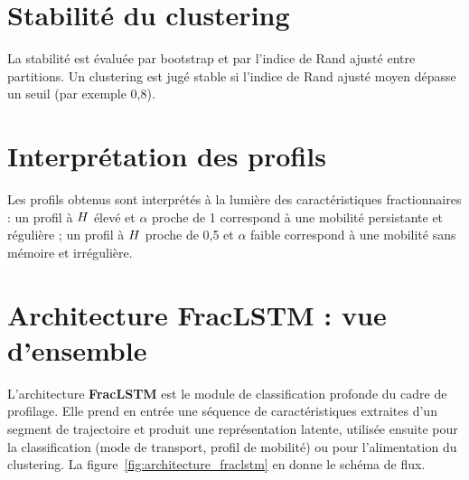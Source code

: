 \section{Stabilité du clustering}
La stabilité est évaluée par bootstrap et par l'indice de Rand ajusté entre partitions. Un clustering est jugé stable si l'indice de Rand ajusté moyen dépasse un seuil (par exemple 0,8).

\section{Interprétation des profils}
Les profils obtenus sont interprétés à la lumière des caractéristiques fractionnaires : un profil à $H$ élevé et $\alpha$ proche de 1 correspond à une mobilité persistante et régulière ; un profil à $H$ proche de 0,5 et $\alpha$ faible correspond à une mobilité sans mémoire et irrégulière.

\section{Architecture FracLSTM : vue d'ensemble}
\label{sec:architecture_fraclstm}

L'architecture \textbf{FracLSTM} est le module de classification profonde du cadre de profilage. Elle prend en entrée une séquence de caractéristiques extraites d'un segment de trajectoire et produit une représentation latente, utilisée ensuite pour la classification (mode de transport, profil de mobilité) ou pour l'alimentation du clustering. La figure~\ref{fig:architecture_fraclstm} en donne le schéma de flux.

